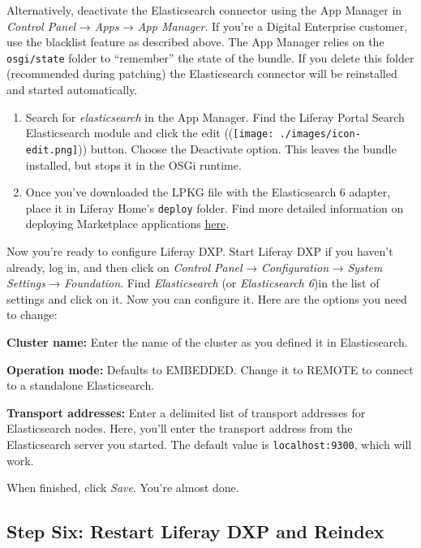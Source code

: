 Alternatively, deactivate the Elasticsearch connector using the App
Manager in \emph{Control Panel} → \emph{Apps} → \emph{App Manager}. If
you're a Digital Enterprise customer, use the blacklist feature as
described above. The App Manager relies on the \texttt{osgi/state}
folder to ``remember'' the state of the bundle. If you delete this
folder (recommended during patching) the Elasticsearch connector will be
reinstalled and started automatically.

\begin{enumerate}
\def\labelenumi{\arabic{enumi}.}
\item
  Search for \emph{elasticsearch} in the App Manager. Find the Liferay
  Portal Search Elasticsearch module and click the edit
  ((\texttt{[image: ./images/icon-edit.png]})) button. Choose the
  Deactivate option. This leaves the bundle installed, but stops it in
  the OSGi runtime.
\item
  Once you've downloaded the LPKG file with the Elasticsearch 6 adapter,
  place it in Liferay Home's \texttt{deploy} folder. Find more detailed
  information on deploying Marketplace applications
  \href{/docs/7-0/user/-/knowledge_base/u/using-the-liferay-marketplace}{here}.
\end{enumerate}

\noindent\hrulefill

Now you're ready to configure Liferay DXP. Start Liferay DXP if you
haven't already, log in, and then click on \emph{Control Panel} →
\emph{Configuration} → \emph{System Settings} → \emph{Foundation}. Find
\emph{Elasticsearch} (or \emph{Elasticsearch 6})in the list of settings
and click on it. Now you can configure it. Here are the options you need
to change:

\textbf{Cluster name:} Enter the name of the cluster as you defined it
in Elasticsearch.

\textbf{Operation mode:} Defaults to EMBEDDED. Change it to REMOTE to
connect to a standalone Elasticsearch.

\textbf{Transport addresses:} Enter a delimited list of transport
addresses for Elasticsearch nodes. Here, you'll enter the transport
address from the Elasticsearch server you started. The default value is
\texttt{localhost:9300}, which will work.

When finished, click \emph{Save}. You're almost done.

\subsection{Step Six: Restart Liferay DXP and
Reindex}\label{step-six-restart-liferay-dxp-and-reindex}


